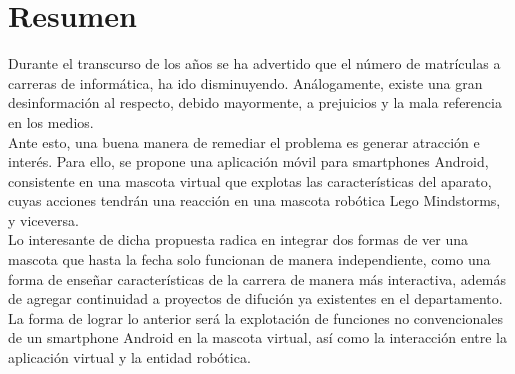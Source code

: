 \documentclass[10pt,letter]{article}
\theoremstyle{definition}
\theoremstyle{remark}
\begin{document}
\section*{Resumen}
Durante el transcurso de los a\~nos se ha advertido que el n\'umero de matr\'iculas a carreras de inform\'atica, ha ido disminuyendo. An\'alogamente, existe una gran desinformaci\'on al respecto, debido mayormente, a prejuicios y la mala referencia en los medios.\\

Ante esto, una buena manera de remediar el problema es generar atracci\'on e inter\'es. Para ello, se propone una aplicaci\'on m\'ovil para smartphones Android, consistente en una mascota virtual que explotas las caracter\'isticas del aparato, cuyas acciones tendr\'an una reacci\'on en una mascota rob\'otica Lego Mindstorms, y viceversa.\\

Lo interesante de dicha propuesta radica en integrar dos formas de ver una mascota que hasta la fecha solo funcionan de manera independiente, como una forma de ense\~nar caracter\'isticas de la carrera de manera m\'as interactiva, adem\'as de agregar continuidad a proyectos de difuci\'on ya existentes en el departamento.\\

La forma de lograr lo anterior ser\'a la explotaci\'on de funciones no convencionales de un smartphone Android en la mascota virtual, as\'i como la interacci\'on entre la aplicaci\'on virtual y la entidad rob\'otica.\\
\end{document}
